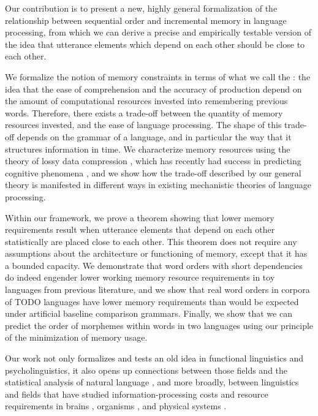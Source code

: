 Our contribution is to present a new, highly general formalization of the relationship between sequential order and incremental memory in language processing, from which we can derive a precise and empirically testable version of the idea that utterance elements which depend on each other should be close to each other. 

We formalize the notion of memory constraints in terms of what we call the : the idea that the ease of comprehension and the accuracy of production depend on the amount of computational resources invested into remembering previous words.
Therefore, there exists a trade-off between the quantity of memory resources invested, and the ease of language processing.
The shape of this trade-off depends on the grammar of a language, and in particular the way that it structures information in time.
We characterize memory resources using the theory of lossy data compression \citep{cover2006elements,berger}, which has recently had success in predicting cognitive phenomena \citep{sims,gershman}, and we show how the trade-off described by our general theory is manifested in different ways in existing mechanistic theories of language processing. %

Within our framework, we prove a theorem showing that lower memory requirements result when utterance elements that depend on each other statistically are placed close to each other. This theorem does not require any assumptions about the architecture or functioning of memory, except that it has a bounded capacity. We demonstrate that word orders with short dependencies do indeed engender lower working memory resource requirements in toy languages from previous literature, and we show that real word orders in corpora of TODO languages have lower memory requirements than would be expected under artificial baseline comparison grammars. Finally, we show that we can predict the order of morphemes within words in two languages using our principle of the minimization of memory usage.

Our work not only formalizes and tests an old idea in functional linguistics and psycholinguistics, it also opens up connections between those fields and the statistical analysis of natural language \citep{debowski-excess-2011,bentz2017word,lin-critical-2017}, and more broadly, between linguistics and fields that have studied information-processing costs and resource requirements in brains \citep{friston}, organisms \citep{england}, and physical systems \citep{still2012thermodynamic}. %








